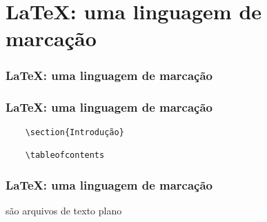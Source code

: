 \section{\LaTeX: uma linguagem de marcação}

\begin{frame}
  \frametitle{\LaTeX: uma linguagem de marcação}
  \LARGE
\end{frame}

\begin{frame}[fragile]
  \frametitle{\LaTeX: uma linguagem de marcação}
  \begin{verbatim}
    \section{Introdução}

    \tableofcontents
  \end{verbatim}
\end{frame}

\begin{frame}
  \frametitle{\LaTeX: uma linguagem de marcação}
  \LARGE
   são arquivos de texto plano
\end{frame}
